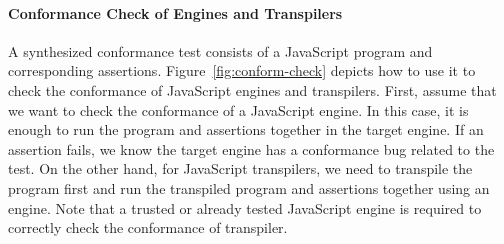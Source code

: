 
\paragraph{\textbf{Conformance Check of Engines and Transpilers}}
%
A synthesized conformance test consists of a JavaScript program and
corresponding assertions.
%
Figure~\ref{fig:conform-check} depicts how to use it to check the conformance of
JavaScript engines and transpilers.
%
First, assume that we want to check the conformance of a JavaScript engine.
%
In this case, it is enough to run the program and assertions together in the
target engine.
%
If an assertion fails, we know the target engine has a conformance bug related
to the test.
%
On the other hand, for JavaScript transpilers, we need to transpile the program
first and run the transpiled program and assertions together using an engine.
%
Note that a trusted or already tested JavaScript engine is required to correctly
check the conformance of transpiler.
